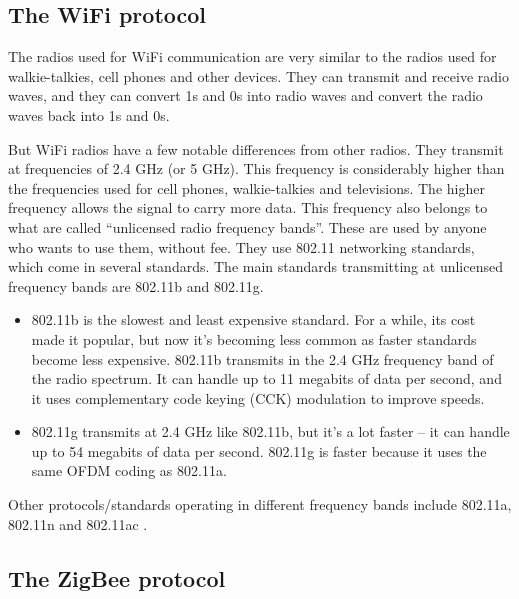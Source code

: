 \documentclass[conference]{IEEEtran}
\begin{document}
\subsection{The WiFi protocol}

The radios used for WiFi communication are very similar to the radios used for walkie-talkies, cell phones and other devices. 
They can transmit and receive radio waves, and they can convert 1s and 0s into radio waves and convert the radio waves back into 1s and 0s. 

But WiFi radios have a few notable differences from other radios. 
They transmit at frequencies of 2.4 GHz (or 5 GHz). 
This frequency is considerably higher than the frequencies used for cell phones, walkie-talkies and televisions. 
The higher frequency allows the signal to carry more data.  
This frequency also belongs to what are called “unlicensed radio frequency bands”. 
These are used by anyone who wants to use them, without fee.
They use 802.11 networking standards, which come in several standards. 
The main standards transmitting at unlicensed frequency bands are 802.11b and 802.11g. 


\begin{itemize}

  \item 
802.11b is the slowest and least expensive standard. 
For a while, its cost made it popular, but now it's becoming less common as faster standards become less expensive. 
802.11b transmits in the 2.4 GHz frequency band of the radio spectrum. 
It can handle up to 11 megabits of data per second, and it uses complementary code keying (CCK) modulation to improve speeds.
  \item 
802.11g transmits at 2.4 GHz like 802.11b, but it's a lot faster -- it can handle up to 54 megabits of data per second. 
802.11g is faster because it uses the same OFDM coding as 802.11a.


\end{itemize}

Other protocols/standards operating in different frequency bands include 802.11a, 802.11n and 802.11ac \cite{howwifiworks}.


\subsection{The ZigBee protocol}
\end{document}
